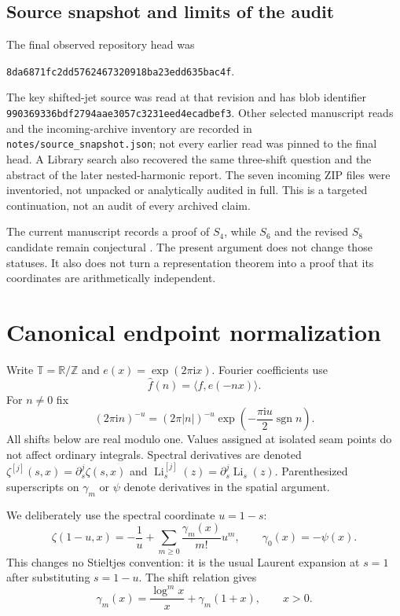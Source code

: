 \documentclass[11pt]{article}
\numberwithin{equation}{section}
\theoremstyle{definition}\newtheorem{definition}[theorem]{Definition}
\theoremstyle{remark}\newtheorem{remark}[theorem]{Remark}
\DeclareMathOperator{\Li}{Li}
\DeclareMathOperator{\sgn}{sgn}
\newcommand{\ii}{\mathrm i}
\newcommand{\TT}{\mathbb T}
\newcommand{\ZZ}{\mathbb Z}
\newcommand{\RR}{\mathbb R}
\newcommand{\src}[1]{\nolinkurl{#1}}
\newcommand{\pin}{\texttt{8da6871fc2dd5762467320918ba23edd635bac4f}}
\begin{document}
\subsection{Source snapshot and limits of the audit}
The final observed repository head was
\begin{center}\pin.\end{center}
The key shifted-jet source was read at that revision and has blob identifier
\src{990369336bdf2794aae3057c3231eed4ecadbef3}.
Other selected manuscript reads and the incoming-archive inventory are
recorded in \src{notes/source_snapshot.json}; not every earlier read was
pinned to the final head. A Library search also recovered the same
three-shift question and the abstract of the later nested-harmonic report.
The seven incoming ZIP files were inventoried, not unpacked or analytically
audited in full. This is a targeted continuation, not an audit of every
archived claim.

The current manuscript records a proof of $S_4$, while $S_6$ and the revised
$S_8$ candidate remain conjectural \cite{tsc:repo}. The present argument does
not change those statuses. It also does not turn a representation theorem
into a proof that its coordinates are arithmetically independent.


\section{Canonical endpoint normalization}\label{tsc:normalization}
Write $\TT=\RR/\ZZ$ and $e(x)=\exp(2\pi\ii x)$. Fourier coefficients use
\[
 \widehat f(n)=\langle f,e(-nx)\rangle.
\]
For $n\ne0$ fix
\begin{equation}\label{tsc:branch}
 (2\pi\ii n)^{-u}=(2\pi|n|)^{-u}
       \exp\!\left(-\frac{\pi\ii u}{2}\sgn n\right).
\end{equation}
All shifts below are real modulo one. Values assigned at isolated seam
points do not affect ordinary integrals. Spectral derivatives are denoted
$\zeta^{[j]}(s,x)=\partial_s^j\zeta(s,x)$ and
$\Li_s^{[j]}(z)=\partial_s^j\Li_s(z)$. Parenthesized superscripts on
$\gamma_m$ or $\psi$ denote derivatives in the spatial argument.

We deliberately use the spectral coordinate $u=1-s$:
\begin{equation}\label{tsc:stieltjes-convention}
 \zeta(1-u,x)=-\frac1u+
     \sum_{m\ge0}\frac{\gamma_m(x)}{m!}u^m,
 \qquad \gamma_0(x)=-\psi(x).
\end{equation}
This changes no Stieltjes convention: it is the usual Laurent expansion
at $s=1$ after substituting $s=1-u$. The shift relation gives
\begin{equation}\label{tsc:gamma-local}
 \gamma_m(x)=\frac{\log^m x}{x}+\gamma_m(1+x),\qquad x>0.
\end{equation}
\end{document}
